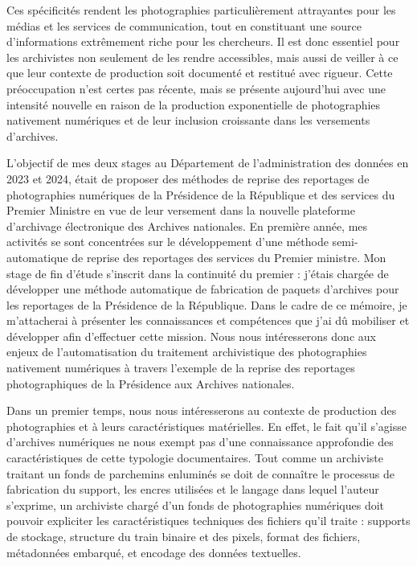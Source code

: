 Ces spécificités rendent les photographies particulièrement attrayantes pour les médias et les services de communication, tout en constituant une source d'informations extrêmement riche pour les chercheurs. Il est donc essentiel pour les archivistes non seulement de les rendre accessibles, mais aussi de veiller à ce que leur contexte de production soit documenté et restitué avec rigueur. Cette préoccupation n'est certes pas récente, mais se présente aujourd'hui avec une intensité nouvelle en raison de la production exponentielle de photographies nativement numériques et de leur inclusion croissante dans les versements d'archives.

L'objectif de mes deux stages au Département de l'administration des données en 2023 et 2024, était de proposer des méthodes de reprise des reportages de photographies numériques de la Présidence de la République et des services du Premier Ministre en vue de leur versement dans la nouvelle plateforme d'archivage électronique des Archives nationales. En première année, mes activités se sont concentrées sur le développement d'une méthode semi-automatique de reprise des reportages des services du Premier ministre. Mon stage de fin d'étude s'inscrit dans la continuité du premier : j'étais chargée de développer une méthode automatique de fabrication de paquets d'archives pour les reportages de la Présidence de la République. Dans le cadre de ce mémoire, je m'attacherai à présenter les connaissances et compétences que j'ai dû mobiliser et développer afin d'effectuer cette mission. Nous nous intéresserons donc aux enjeux de l'automatisation du traitement archivistique des photographies nativement numériques à travers l'exemple de la reprise des reportages photographiques de la Présidence aux Archives nationales.

Dans un premier temps, nous nous intéresserons au contexte de production des photographies et à leurs caractéristiques matérielles. En effet, le fait qu'il s'agisse d'archives numériques ne nous exempt pas d'une connaissance approfondie des caractéristiques de cette typologie documentaires. Tout comme un archiviste traitant un fonds de parchemins enluminés se doit de connaître le processus de fabrication du support, les encres utilisées et le langage dans lequel l'auteur s'exprime, un archiviste chargé d'un fonds de photographies numériques doit pouvoir expliciter les caractéristiques techniques des fichiers qu'il traite : supports de stockage, structure du train binaire et des pixels, format des fichiers, métadonnées embarqué, et encodage des données textuelles. 

